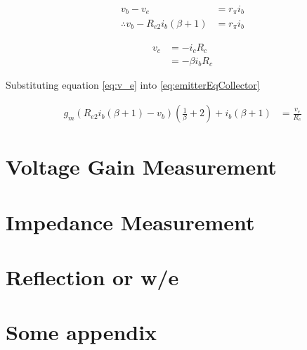 \documentclass[a4paper,11pt]{article}
\begin{document}
\begin{subequations}
\begin{align}
v_b - v_e &= r_\pi i_b\\
\therefore v_b - R_{e2} i_b (\beta + 1) &= r_\pi i_b
\end{align}
\end{subequations}

\begin{subequations}
\begin{align}
v_c &= -i_c R_c\\
&= -\beta i_b R_c \label{eq:v_c}
\end{align}
\end{subequations}

Substituting equation \ref{eq:v_e} into \ref{eq:emitterEqCollector}

\begin{subequations}
\begin{align}
g_m \left(R_{e2} i_b (\beta + 1) - v_b\right) \left( \frac{1}{\beta} + 2 \right) + i_b (\beta + 1) &= \frac{v_c}{R_c}
\end{align}
\end{subequations}

\section{Voltage Gain Measurement}

\section{Impedance Measurement}

\section{Reflection or w/e}

\begin{appendices}
    \label{appendix}
    \section{Some appendix}
    \label{app:one}
\end{appendices}



\end{document}
